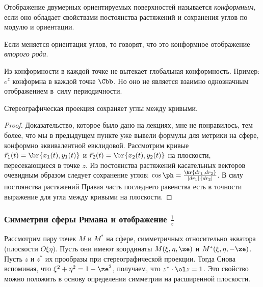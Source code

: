 \documentclass[a4paper]{article}
\begin{document}
\begin{df}
Отображение двумерных  ориентируемых поверхностей называется \emph{конформным}, если оно обладает свойствами постоянства
растяжений и сохранения углов по модулю и ориентации.
\end{df}

Если меняется ориентация углов, то говорят, что это конформное отображение \emph{второго рода}.

\begin{note}
Из конформности в каждой точке не вытекает глобальная конформность. Пример: $e^z$ конформна в каждой точке $\Cbb$.
Но оно не является взаимно однозначным отображением в~силу периодичности.
\end{note}

\begin{theorem}
Стереографическая проекция сохраняет углы между кривыми.
\end{theorem}
\begin{proof}
Доказательство, которое было дано на лекциях, мне не понравилось, тем более, что мы в предыдущем пункте уже
вывели формулы для метрики на сфере, конформно эквивалентной евклидовой. Рассмотрим кривые $\vec r_1(t) = \br{x_1(t),y_1(t)}$ и
$\vec r_2(t) = \br{x_2(t),y_2(t)}$ на плоскости, пересекающиеся в точке $z$. Из постоянства растяжений касательных векторов очевидным образом следует сохранение углов:
$\cos\ph = \frac{\hr{dr_1, dr_2}}{|dr_1| \cdot |dr_2|}$. В силу постоянства растяжений
Правая часть последнего равенства есть в точности выражение для угла между кривыми на плоскости.
\end{proof}

\subsubsection{Симметрии сферы Римана и отображение $\frac{1}{z}$}

Рассмотрим пару точек $M$ и $M^*$ на сфере, симметричных относительно экватора (плоскости $O\xi\eta$). Пусть
они имеют координаты $M(\xi,\eta,\ze)$ и $M^*(\xi,\eta,-\ze)$. Пусть $z$ и $z^*$ их прообразы при стереографической
проекции. Тогда
Снова вспоминая, что $\xi^2+\eta^2 = 1-\ze^2$, получаем, что $z^*\cdot \ol z = 1$.
Это свойство можно положить в основу определения симметрии на расширенной плоскости.
\end{document}

